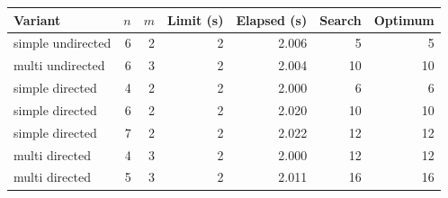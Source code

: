 \begin{tabular}{lrrrrrr}
\toprule
Variant & $n$ & $m$ & Limit (s) & Elapsed (s) & Search & Optimum \\
\midrule
simple undirected & 6 & 2 & 2 & 2.006 & 5 & 5 \\
multi undirected & 6 & 3 & 2 & 2.004 & 10 & 10 \\
simple directed & 4 & 2 & 2 & 2.000 & 6 & 6 \\
simple directed & 6 & 2 & 2 & 2.020 & 10 & 10 \\
simple directed & 7 & 2 & 2 & 2.022 & 12 & 12 \\
multi directed & 4 & 3 & 2 & 2.000 & 12 & 12 \\
multi directed & 5 & 3 & 2 & 2.011 & 16 & 16 \\
\bottomrule
\end{tabular}
